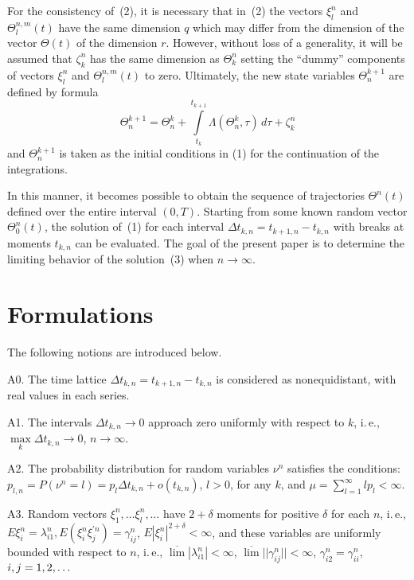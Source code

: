 \begin{multicols}{2}
For the consistency of~(2), it is necessary that in~(2) the vectors $ \xi^n_l $ and 
$\Theta^{n,m}_l (t)$ have the same dimension $q$ which may differ from the dimension 
of the vector $\Theta(t) $ of the dimension $r$. However, without loss of a generality, it 
will be assumed that $\zeta^n_k$ has the same dimension as $\Theta^n_k$ setting the ``dummy'' 
components of vectors $\xi^n_l$ and $ \Theta^{n,m}_l (t)$ to zero. Ultimately, the new state 
variables  $\Theta^{k+1}_n$ are defined by formula
\begin{equation}
\Theta^{k+1}_n = \Theta^{k}_n + \int\limits^{t_{k+1}}_{t_k}\Lambda (\Theta^{k}_n, \tau)\,d\tau 
+ \zeta^n_k  
\label{e3-b}
\end{equation}
and $\Theta^{k+1}_n$ is taken as the initial conditions in (1) for the continuation of the 
integrations.

In this manner, it becomes possible to obtain the sequence of trajectories $\Theta^n(t)$ 
defined over the entire interval $(0,T)$. Starting from some known random vector $\Theta^n_0(t)$, 
the solution of~(1) for each interval $ \Delta t_{k,n} =  t_{k+1,n}-t_{k,n}$ with breaks at 
moments $t_{k,n}$ can be evaluated. The goal of the present paper is to determine the limiting 
behavior of the solution~(3) when $n \rightarrow \infty$. 

\section{Formulations}

\noindent
The following notions are introduced below.

A0. The time lattice $ \Delta t_{k,n} =  t_{k+1,n}-t_{k,n}$ is considered as nonequidistant, 
with real values in each series.

A1. The intervals $ \Delta t_{k,n} \rightarrow 0$ approach zero uniformly with respect to  $k$, 
i.\,e.,   $\max\limits_{k}\Delta t_{k,n} \rightarrow 0$, $n \rightarrow \infty$.

A2. The probability distribution for random variables $\nu^n$ satisfies the conditions: 
$p_{l,n}=P(\nu^n=l)$\linebreak $=p_l\Delta t_{k,n}+o(t_{k,n})$, $l>0$, for any $k$, and 
$\mu =\sum\limits_{l=1}^{\infty }lp_{l}$\linebreak $  <\infty$.

A3. Random vectors $\xi_{1}^{n} ,\ldots \xi_{l}^{n} ,\ldots$ have 
$2+\delta$ moments for positive $\delta$ for each $n$, i.\,e., 
$E\xi_{i}^{n}$\linebreak $=\lambda_{i1}^{n} ,E(\xi_{i}^{n} \xi_j^{\prime n} )=\gamma_{ij}^{n} $, 
$E|\xi_{i}^{n} |^{2+\delta } <\infty $, and these variables are uniformly bounded with 
respect to $n$, i.\,e., $\overline{\lim }|\lambda_{i1}^{n} |<\infty$, $\overline{\lim} 
||\gamma_{ij}^{n} ||<\infty$, $\gamma_{i2}^{n} =\gamma_{ii}^{n} $, $i,j\hm=1,2,\dots$


\end{multicols}
